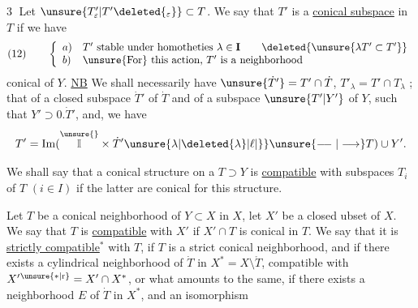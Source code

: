 \textcircled{3} Let
 $\unsure{T'_\varepsilon|T'\deleted{_\varepsilon}}\subset T$.
We say that $T'$ is a \uline{conical subspace} in $T$ if we have
\[
(12)\qquad\left\{\begin{array}{ll}
a)&T'\text{ stable under homotheties }\lambda\in\mathbf{I}\qquad
\deleted{\unsure{\lambda T'\subset T'}}\\
b)&\text{\unsure{For} this action, }T'\text{ is a neighborhood}
\end{array}\right.
\]
 conical of $Y$.
\uline{NB} We shall necessarily have $\unsure{\dot T'}=T'\cap\dot T$,
$T'_\lambda=T'\cap T_\lambda$ ;
that of a closed subspace $\dot T'$ of $\dot T$
and of a subspace $\unsure{T'|Y'}$ of $Y$, such that $Y'\supset0.\dot T'$, and,
we have
\[
T'=\operatorname{Im}(\overset{\unsure{}}{\mathbb{I}}\times
\dot T'\unsure{\lambda|\deleted{\lambda}|\ell|\}}
\unsure{\mathrel{\relbar\joinrel\relbar}|\longrightarrow}T)\cup Y'.
\]

We shall say that a conical structure on
a $T\supset Y$ is \uline{compatible} with  subspaces
$T_i$ of $T$ $(i\in I)$ if the latter
are conical for this structure.

Let $T$ be a conical neighborhood of $Y\subset X$
in $X$, let $X'$ be a closed ubset of $X$. We
say that $T$ is \uline{compatible} with $X'$ if
$X'\cap T$ is conical in $T$. We say that it
is \uline{strictly compatible}$^{*}$ with $T$, if
$T$ is a strict conical neighborhood, and if there exists
a cylindrical neighborhood of $\dot T$ in
$X^*=X\setminus\mathring T$, compatible with
$X'{}^{\unsure{*|\mathrm r}}=X'\cap X^*$,
or what amounts to the same, if there exists a
neighborhood $E$ of $\dot T$ in $X^*$, and an isomorphism
